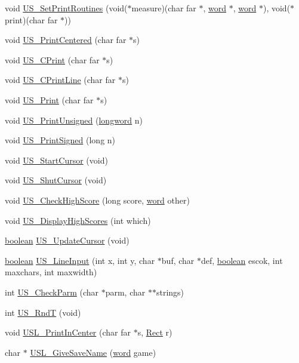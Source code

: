 \begin{DoxyCompactItemize}
\item 
void \hyperlink{ID__US_8H_aed7467cd936e319d9378cf958bd02236}{US\_\-SetPrintRoutines} (void($\ast$measure)(char far $\ast$, \hyperlink{ID__HEAD_8H_abad51e07ab6d26bec9f1f786c8d65bcd}{word} $\ast$, \hyperlink{ID__HEAD_8H_abad51e07ab6d26bec9f1f786c8d65bcd}{word} $\ast$), void($\ast$print)(char far $\ast$))
\item 
void \hyperlink{ID__US_8H_a524fd911a8a3ceedd0a3efe9b5f76830}{US\_\-PrintCentered} (char far $\ast$s)
\item 
void \hyperlink{ID__US_8H_a45d1b7ebde4b4cbfd5a34b3b0134ee8b}{US\_\-CPrint} (char far $\ast$s)
\item 
void \hyperlink{ID__US_8H_ad8fa7aed3bed622bff4925586de5e0dd}{US\_\-CPrintLine} (char far $\ast$s)
\item 
void \hyperlink{ID__US_8H_ae158b4a99ff8fe4bca4517925b6b429c}{US\_\-Print} (char far $\ast$s)
\item 
void \hyperlink{ID__US_8H_aaaf7bf10a561ab0338f8b3742c408b86}{US\_\-PrintUnsigned} (\hyperlink{ID__HEAD_8H_a8a9a7dd50c6fdb45dcdf0eb929479663}{longword} n)
\item 
void \hyperlink{ID__US_8H_adcea441d26d8338b8eb2cd44c3c4a105}{US\_\-PrintSigned} (long n)
\item 
void \hyperlink{ID__US_8H_a7784ccadb4700633909e272573d49806}{US\_\-StartCursor} (void)
\item 
void \hyperlink{ID__US_8H_a80fd969f89032b7571d470dbcfc70d1b}{US\_\-ShutCursor} (void)
\item 
void \hyperlink{ID__US_8H_a8b3adcb17ce610352bb65780387320e7}{US\_\-CheckHighScore} (long score, \hyperlink{ID__HEAD_8H_abad51e07ab6d26bec9f1f786c8d65bcd}{word} other)
\item 
void \hyperlink{ID__US_8H_aa2674d21db32bed27292c1ba0f1f08fe}{US\_\-DisplayHighScores} (int which)
\item 
\hyperlink{ID__HEAD_8H_a7c6368b321bd9acd0149b030bb8275ed}{boolean} \hyperlink{ID__US_8H_a97bebeef6503c38ba7c0b7c61840e9b3}{US\_\-UpdateCursor} (void)
\item 
\hyperlink{ID__HEAD_8H_a7c6368b321bd9acd0149b030bb8275ed}{boolean} \hyperlink{ID__US_8H_a8b8c9a7afe469e4c90c2540c9158ea94}{US\_\-LineInput} (int x, int y, char $\ast$buf, char $\ast$def, \hyperlink{ID__HEAD_8H_a7c6368b321bd9acd0149b030bb8275ed}{boolean} escok, int maxchars, int maxwidth)
\item 
int \hyperlink{ID__US_8H_ab779824eaa9432170162847f92aff6f9}{US\_\-CheckParm} (char $\ast$parm, char $\ast$$\ast$strings)
\item 
int \hyperlink{ID__US_8H_af7dbbf782f072ed2c7cb57cd66b10c24}{US\_\-RndT} (void)
\item 
void \hyperlink{ID__US_8H_abd887f54352061deb6deb73c7ff9399e}{USL\_\-PrintInCenter} (char far $\ast$s, \hyperlink{structRect}{Rect} r)
\item 
char $\ast$ \hyperlink{ID__US_8H_a8cfc23ff1c5be3546c42fa0965a65580}{USL\_\-GiveSaveName} (\hyperlink{ID__HEAD_8H_abad51e07ab6d26bec9f1f786c8d65bcd}{word} game)
\end{DoxyCompactItemize}
